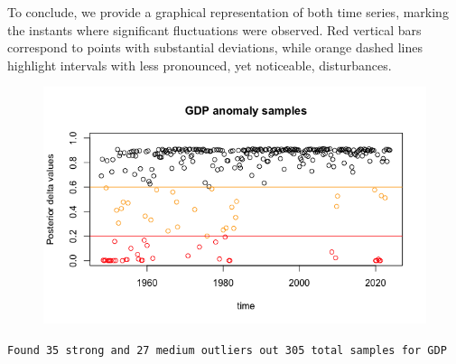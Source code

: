 \documentclass{Configuration_Files/PoliMi3i_thesis}
\begin{document}
To conclude, we provide a graphical representation of both time series, marking the instants where significant fluctuations were observed. Red vertical bars correspond to points with substantial deviations, while orange dashed lines highlight intervals with less pronounced, yet noticeable, disturbances.\\
\begin{figure}[H]
    \centering
    \includegraphics[width=0.75\linewidth]{GDP_anomaly.png}
\end{figure}
\begin{center}
    \texttt{Found 35 strong and 27 medium outliers out 305 total samples for GDP}
\end{center}
\end{document}
